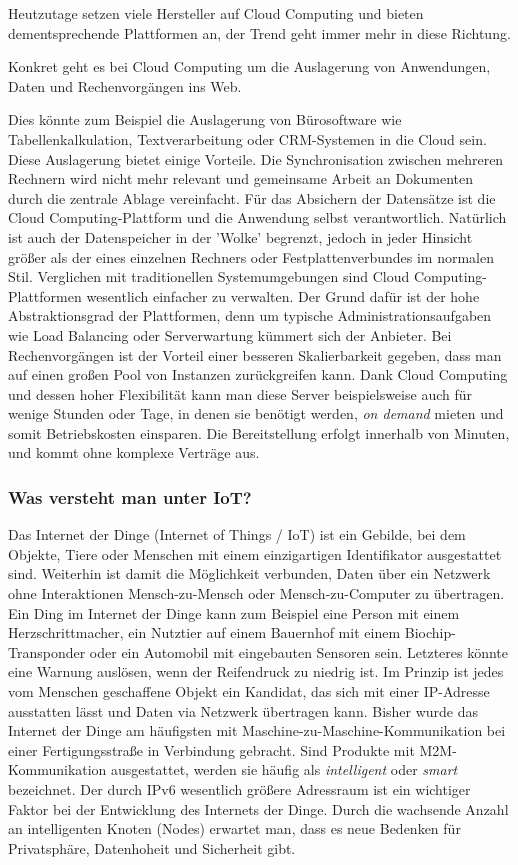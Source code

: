 \documentclass[letterpaper, 12pt]{article}
\let\tempsubsubsection\subsubsection
\renewcommand\subsubsection[1]{\vspace{0cm}\tempsubsubsection{#1}\vspace{0cm}}
\begin{document}
Heutzutage setzen viele Hersteller auf Cloud Computing und bieten dementsprechende Plattformen an, der Trend geht immer mehr in diese Richtung. \begin{center}
Konkret geht es bei Cloud Computing um die Auslagerung von Anwendungen, Daten und Rechenvorgängen ins Web. \\
\end{center} 
Dies könnte zum Beispiel die Auslagerung von Bürosoftware wie Tabellenkalkulation, Textverarbeitung oder CRM-Systemen in die Cloud sein.
Diese Auslagerung bietet einige Vorteile. Die Synchronisation zwischen mehreren Rechnern wird nicht mehr relevant und gemeinsame Arbeit an Dokumenten durch die zentrale Ablage vereinfacht. Für das Absichern der Datensätze ist die Cloud Computing-Plattform und die Anwendung selbst verantwortlich. Natürlich ist auch der Datenspeicher in der 'Wolke' begrenzt, jedoch in jeder Hinsicht größer als der eines einzelnen Rechners oder Festplattenverbundes im normalen Stil. Verglichen mit traditionellen Systemumgebungen sind Cloud Computing-Plattformen wesentlich einfacher zu verwalten. Der Grund dafür ist der hohe Abstraktionsgrad der Plattformen, denn um typische Administrationsaufgaben wie Load Balancing oder Serverwartung kümmert sich der Anbieter. Bei Rechenvorgängen ist der Vorteil einer besseren Skalierbarkeit gegeben, dass man auf einen großen Pool von Instanzen zurückgreifen kann. Dank Cloud Computing und dessen hoher Flexibilität kann man diese Server beispielsweise auch für wenige Stunden oder Tage, in denen sie benötigt werden, \textit{on demand} mieten und somit Betriebskosten einsparen. Die Bereitstellung erfolgt innerhalb von Minuten, und kommt ohne komplexe Verträge aus.\cite{ausarbeitungcc}

\subsubsection{Was versteht man unter IoT?}

Das Internet der Dinge (Internet of Things / IoT) ist ein Gebilde, bei dem Objekte, Tiere oder Menschen mit einem einzigartigen Identifikator ausgestattet sind. Weiterhin ist damit die Möglichkeit verbunden, Daten über ein Netzwerk ohne Interaktionen Mensch-zu-Mensch oder Mensch-zu-Computer zu übertragen. Ein Ding im Internet der Dinge kann zum Beispiel eine Person mit einem Herzschrittmacher, ein Nutztier auf einem Bauernhof mit einem Biochip-Transponder oder ein Automobil mit eingebauten Sensoren sein. Letzteres könnte eine Warnung auslösen, wenn der Reifendruck zu niedrig ist. Im Prinzip ist jedes vom Menschen geschaffene Objekt ein Kandidat, das sich mit einer IP-Adresse ausstatten lässt und Daten via Netzwerk übertragen kann. Bisher wurde das Internet der Dinge am häufigsten mit Maschine-zu-Maschine-Kommunikation bei einer Fertigungsstraße in Verbindung gebracht. Sind Produkte mit M2M-Kommunikation ausgestattet, werden sie häufig als \textit{intelligent} oder \textit{smart} bezeichnet. Der durch IPv6 wesentlich größere Adressraum ist ein wichtiger Faktor bei der Entwicklung des Internets der Dinge. Durch die wachsende Anzahl an intelligenten Knoten (Nodes) erwartet man, dass es neue Bedenken für Privatsphäre, Datenhoheit und Sicherheit gibt. \cite{iot} \clearpage
\end{document}

